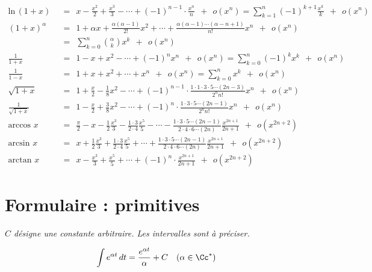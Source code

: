 \documentclass[class=report,crop=false]{standalone}
\begin{document}
{\small
\begin{align*}
\text{ln}\, (1+x)&\ \ =\ \
x - \frac{x^2}{2}+\frac{x^3}{3}- \cdots + (-1)^{n-1}\cdot\frac{x^n}{n}\ \  + \ \ o(x^n)
= \sum_{k=1}^n (-1)^{k+1} \frac{x^k}{k} \ \  + \ \ o(x^n)
\\[0.5em]
(1+x)^\alpha &\ \ =\ \
1 + \alpha x + \frac{\alpha(\alpha - 1)}{2!}x^2+ \cdots +
\frac {\alpha(\alpha-1)\cdots(\alpha - n+1)}{n!} x^n \ \  + \ \ o(x^n)\\
&\ \ =\ \ \sum_{k=0}^n \binom{\alpha}{k} x^k \ \  + \ \ o(x^n)
\\[1.2em]
\frac{1}{1+x}&\ \ =\ \
1 -x+x^2-\cdots+(-1)^n x^n \ \ +\ \ o(x^n)
= \sum_{k=0}^n (-1)^k x^k \ \ +\ \ o(x^n)
\\[0.5em]
\frac{1}{1-x}&\ \ =\ \
1 + x+x^2+ \cdots+ x^n\ \ +\ \ o(x^n) = \sum_{k=0}^n x^k \ \ +\ \ o(x^n)
\\[0.5em]
\sqrt{1+x}&\ \ =\ \
1 + \frac{x}{2} - \frac{1}{8}x^2- \cdots +
(-1)^{n-1}\cdot\frac{1\cdot1\cdot3\cdot5\cdots(2n-3)}{2^n n!}x^n\ \  + \ \ o(x^n)
\\[0.5em]
\frac{1}{\sqrt{1+x}}&\ \ =\ \
1 - \frac{x}{2} + \frac{3}{8}x^2- \cdots +
(-1)^{n}\cdot\frac{1\cdot3\cdot5\cdots(2n-1)}{2^n n!} x^n\ \ + \ \ o(x^n)
\\[1.2em]
\text{arccos } x &\ \ =\ \
\frac{\pi}{2} - x - \frac{1}{2}\frac{x^3}{3} - \frac{1\cdot3}{2\cdot4}\frac{x^5}{5}- \cdots -
\frac{1\cdot3\cdot5\cdots(2n-1)}{2\cdot4\cdot6\cdots(2n)} \frac{x^{2n+1}}{2n+1}\ \ + \ \ o(x^{2n+2})
\\[0.5em]
\text{arcsin } x &\ \ =\ \
x + \frac{1}{2}\frac{x^3}{3} + \frac{1\cdot3}{2\cdot4}\frac{x^5}{5}+ \cdots +
\frac{1\cdot3\cdot5\cdots(2n-1)}{2\cdot4\cdot6\cdots(2n)} \frac{x^{2n+1}}{2n+1}\ \ + \ \ o(x^{2n+2})
\\[0.5em]
\text{arctan } x &\ \ =\ \
x - \frac{x^3}{3}+\frac{x^5}{5}+ \cdots + (-1)^{n}\cdot\frac{x^{2n+1}}{2n+1}\ \  + \ \ o(x^{2n+2})
\end{align*}
}



\newpage
\section{Formulaire : primitives}


\emph{$C$ d\'esigne une constante arbitraire. Les intervalles sont \`a pr\'eciser.}

$$\int e^{\alpha t} \, dt= \frac{e^{\alpha t}}{\alpha}+C \quad (\alpha \in \Cc^*)$$
\end{document}
